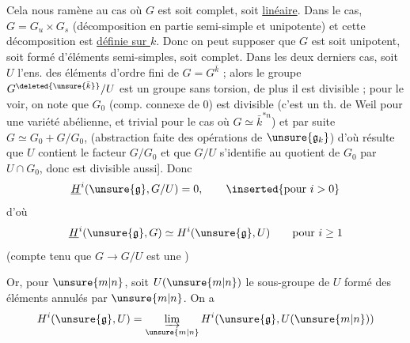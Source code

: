 
Cela nous ramène au cas où $G$ est soit complet, soit \uline{linéaire}. Dans le   cas,  $G=G_u\times G_s$ (décomposition en partie semi-simple et unipotente) et cette décomposition est \uline{définie sur $k$}.
Donc on peut supposer que $G$ est soit unipotent, soit  formé d'éléments semi-simples, soit complet.
Dans les deux derniers cas, soit $U$ l'ens. des éléments d'ordre fini de $G=G^{\bar k}$ ; alors le groupe $G^{\deleted{\unsure{\bar k}}}/U$ est un groupe sans torsion, de plus il est divisible ; pour le voir, on note que $G_0$ (comp. connexe de $0$) est divisible (c'est un th. de Weil pour une variété abélienne, et  trivial pour le cas où $G\simeq\bar k^{*n}$) et  par suite $G\simeq G_0+G/G_0$,  (abstraction faite des opérations de $\unsure{\mathfrak g_k}$) d'où résulte que $U$ contient le facteur $G/G_0$ et que $G/U$ s'identifie au quotient de $G_0$ par $U\cap G_0$, donc est divisible aussi].
Donc 
\[
\underline H^i(\unsure{\mathfrak g},G/U)=0,\qquad\inserted{\text{pour }i>0}
\]
 d'où
\[
\underline H^i(\unsure{\mathfrak g},G)\simeq H^i(\unsure{\mathfrak g},U)\qquad\text{pour }i\geq1
\]
(compte tenu que $G\longrightarrow G/U$ est une )

Or, pour \deleted{$\unsure{\forall}$} $\unsure{m|n}$, soit $U(\unsure{m|n})$ le sous-groupe de $U$ formé des éléments annulés par $\unsure{m|n}$. On a
\[
H^i(\unsure{\mathfrak g},U)=\varinjlim_{\unsure{m|n}}H^i(\unsure{\mathfrak g},U(\unsure{m|n}))
\]


